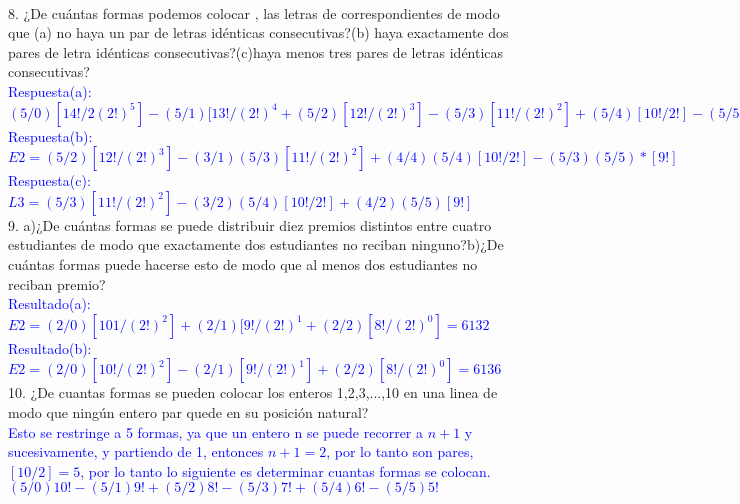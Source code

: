 \documentclass{article}
\begin{document}
\\
8. ¿De cuántas formas podemos colocar , las letras de correspondientes de modo que (a) no haya un par de letras idénticas consecutivas?(b) haya exactamente dos pares de letra idénticas consecutivas?(c)haya menos tres pares de letras idénticas consecutivas?\\
\textcolor{blue}{Respuesta(a):\\$(5/0)[14!/2(2!)^5]-(5/1)[13!/(2!)^4+(5/2)[12!/(2!)^3]-(5/3)[11!/(2!)^2]+(5/4)[10!/2!]-(5/5)[9!]$\\Respuesta(b):\\$E2=(5/2)[12!/(2!)^3]-(3/1)(5/3)[11!/(2!)^2]+(4/4)(5/4)[10!/2!]-(5/3)(5/5)*[9!]$\\Respuesta(c):\\
$L3=(5/3)[11!/(2!)^2]-(3/2)(5/4)[10!/2!]+(4/2)(5/5)[9!]$
}
\\
9. a)¿De cuántas formas se puede distribuir diez premios distintos entre cuatro estudiantes de modo que exactamente dos estudiantes no reciban ninguno?b)¿De cuántas formas puede hacerse esto de modo que al menos dos estudiantes no reciban premio?\\
\textcolor{blue}{Resultado(a):\\$E2=(2/0)[101/(2!)^2]+(2/1)[9!/(2!)^1+(2/2)[8!/(2!)^0]=6132$\\Resultado(b):\\$E2=(2/0)[10!/(2!)^2]-(2/1)[9!/(2!)^1]+
(2/2)[8!/(2!)^0]=6136$
}
\\
10. ¿De cuantas formas se pueden colocar los enteros 1,2,3,...,10 en una linea de modo que ningún entero par quede en su posición natural?\\
\textcolor{blue}{Esto se restringe a 5 formas, ya que un entero n se puede recorrer a $n+1$ y sucesivamente, y partiendo de 1, entonces $n+1=2$, por lo tanto son pares, $[10/2]=5$, por lo tanto lo siguiente es determinar cuantas formas se colocan.\\$(5/0)10!-(5/1)9!+(5/2)8!-(5/3)7!+(5/4)6!-(5/5)5!$
}
\end{document}
